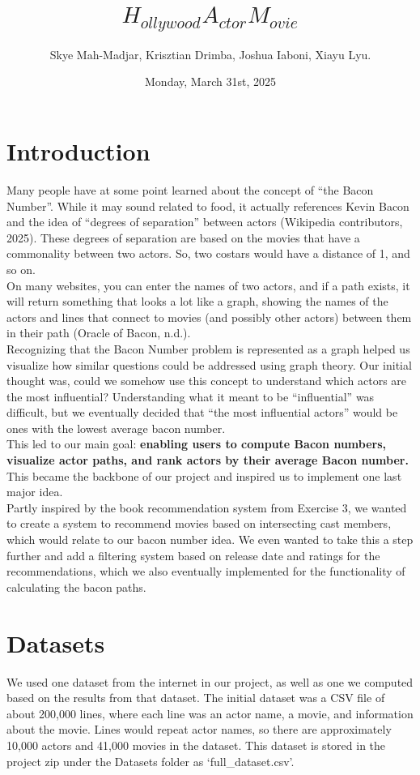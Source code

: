 \documentclass{article}
\title{$H_{ollywood}A_{ctor}M_{ovie}$ \text{and Bacon}}
\author{Skye Mah-Madjar, Krisztian Drimba, Joshua Iaboni, Xiayu Lyu.}
\date{Monday, March 31st, 2025}
\begin{document}
\maketitle

\section*{Introduction}
Many people have at some point learned about the concept of “the Bacon Number”. While it may sound related to food, it actually references Kevin Bacon and the idea of “degrees of separation” between actors (Wikipedia contributors, 2025). These degrees of separation are based on the movies that have a commonality between two actors. So, two costars would have a distance of 1, and so on. \\

On many websites, you can enter the names of two actors, and if a path exists, it will return something that looks a lot like a graph, showing the names of the actors and lines that connect to movies (and possibly other actors) between them in their path (Oracle of Bacon, n.d.). \\

Recognizing that the Bacon Number problem is represented as a graph helped us visualize how similar questions could be addressed using graph theory. Our initial thought was, could we somehow use this concept to understand which actors are the most influential? Understanding what it meant to be “influential” was difficult, but we eventually decided that “the most influential actors” would be ones with the lowest average bacon number. \\

This led to our main goal: \textbf{enabling users to compute Bacon numbers, visualize actor paths, and rank actors by their average Bacon number.} This became the backbone of our project and inspired us to implement one last major idea. \\

Partly inspired by the book recommendation system from Exercise 3, we wanted to create a system to recommend movies based on intersecting cast members, which would relate to our bacon number idea. We even wanted to take this a step further and add a filtering system based on release date and ratings for the recommendations, which we also eventually implemented for the functionality of calculating the bacon paths. \\

\section*{Datasets}
We used one dataset from the internet in our project, as well as one we computed based on the results from that dataset. The initial dataset was a CSV file of about 200,000 lines, where each line was an actor name, a movie, and information about the movie. Lines would repeat actor names, so there are approximately 10,000 actors and 41,000 movies in the dataset. This dataset is stored in the project zip under the Datasets folder as ‘full\_dataset.csv’. \\
\end{document}
